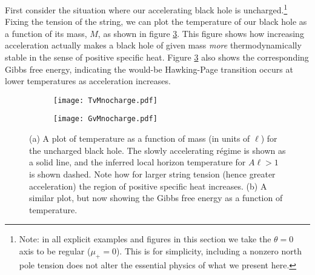 \documentclass[
twoside,
openright,
frontopenright
]{dmathesis}
\begin{document}
First consider the situation where our accelerating black hole is
uncharged.\footnote{ Note: in all explicit examples and figures in this section
  we take the $\theta=0$ axis to be regular ($\mu_+=0$). This is for simplicity,
  including a nonzero north pole tension does not alter the essential physics of
  what we present here.}  Fixing the tension of the string, we can plot the
temperature of our black hole as a function of its mass, $M$, as shown in figure
\ref{fig:TvMnocharge}.  This figure shows how increasing acceleration actually
makes a black hole of given mass {\it more} thermodynamically stable in the
sense of positive specific heat. Figure \ref{fig:TvMnocharge} also shows the
corresponding Gibbs free energy, indicating the would-be Hawking-Page transition
occurs at lower temperatures as acceleration increases.
\begin{figure}
  \centering
  \begin{subfigure}[b]{0.45\textwidth}
    \texttt{[image: TvMnocharge.pdf]}
    \caption{\label{fig:TvMnochargea}}
  \end{subfigure}\quad
  \begin{subfigure}[b]{0.45\textwidth}
    \texttt{[image: GvMnocharge.pdf]}
    \caption{\label{fig:TvMnocharge}}
  \end{subfigure}
  \caption{\label{fig:TvMnocharge}(a) A plot of temperature as a
    function of mass (in units of $\ell$) for the uncharged black hole.  The
    slowly accelerating r\'egime is shown as a solid line, and the inferred
    local horizon temperature for $A\ell>1$ is shown dashed. Note how for larger
    string tension (hence greater acceleration) the region of positive specific
    heat increases. (b) A similar plot, but now showing the Gibbs free
    energy as a function of temperature.}
\end{figure}
\end{document}
